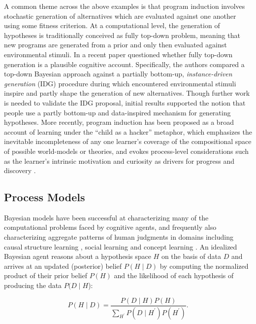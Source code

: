 \documentclass[doc,natbib,floatsintext]{apa7}
\begin{document}
A common theme across the above examples is that program induction involves stochastic generation of alternatives which are evaluated against one another using some fitness criterion. At a computational level, the generation of hypotheses is traditionally conceived as fully top-down problem, meaning that new programs are generated from a prior and only then evaluated against environmental stimuli. In a recent paper \cite{bramley2018grounding} questioned whether fully top-down generation is a plausible cognitive account. Specifically, the authors compared a top-down Bayesian approach against a partially bottom-up, \textit{instance-driven generation} (IDG) procedure during which encountered environmental stimuli inspire and partly shape the generation of new alternatives. Though further work is needed to validate the IDG proposal, initial results supported the notion that people use a partly bottom-up and data-inspired mechanism for generating hypotheses. More recently, program induction has been proposed as a broad account of learning under the ``child as a hacker'' metaphor, which emphasizes the inevitable incompleteness of any one learner's coverage of the compositional space of possible world-models or theories, and evokes process-level considerations such as the learner's intrinsic motivation and curiosity as drivers for progress and discovery \citep{rule2020child}.

\subsection{Process Models}
Bayesian models have been successful at characterizing many of the computational problems faced by cognitive agents, and frequently also characterizing aggregate patterns of human judgments in domains including causal structure learning \citep{gopnik2004theory, griffiths2005structure, griffiths2009theory}, social learning \citep{feldmanhall2019resolving} and concept learning \citep{goodman2008rational,piantadosi2016logical}. An idealized Bayesian agent reasons about a hypothesis space \(H\) on the basis of  data \(D\) and
arrives at an updated (posterior) belief \(P(H\mid D)\) by computing the normalized product of their prior belief \(P(H)\) and the likelihood of each hypothesis of producing the data \(P(D\mid H\)):

\begin{equation}
    P(H\mid D) = \frac{P(D\mid H)P(H)}{\sum_{H^{'}}P(D\mid H^{'})P(H^{'})}.
\label{equ:equ_1_bayes}
\end{equation}
  
\end{document}
